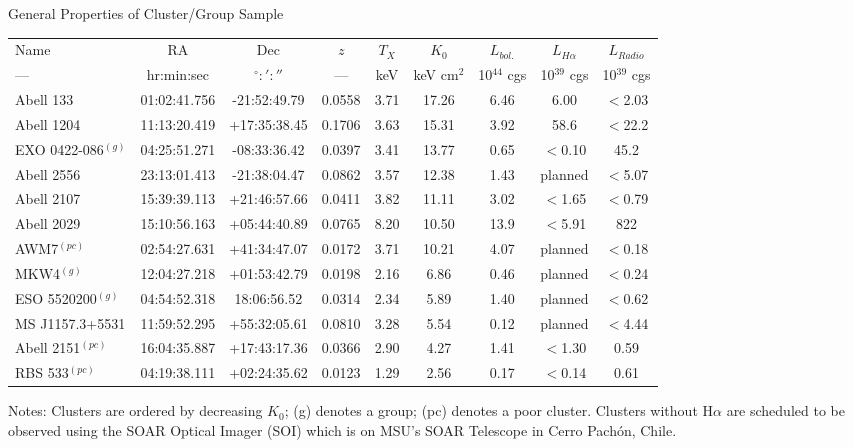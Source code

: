 \documentclass[11pt]{article}
\begin{document}
\begin{center}
General Properties of Cluster/Group Sample
\small
\begin{tabular}{lcccccccc}
\hline
Name & RA         & Dec           & $z$   & $T_X$ & $K_0$      & $L_{bol.}$    & $L_{H\alpha}$ & $L_{Radio}$\\
---  & hr:min:sec & $^\circ:':''$ & ---   & keV   & keV cm$^2$ & 10$^{44}$ cgs & 10$^{39}$ cgs & 10$^{39}$ cgs\\
\hline
\hline
Abell 133            & 01:02:41.756 & -21:52:49.79 & 0.0558 & 3.71 & 17.26 & 6.46 & 6.00    & $<$2.03\\
Abell 1204           & 11:13:20.419 & +17:35:38.45 & 0.1706 & 3.63 & 15.31 & 3.92 & 58.6    & $<$22.2\\
EXO 0422-086$^{(g)}$ & 04:25:51.271 & -08:33:36.42 & 0.0397 & 3.41 & 13.77 & 0.65 & $<$0.10 & 45.2\\
Abell 2556           & 23:13:01.413 & -21:38:04.47 & 0.0862 & 3.57 & 12.38 & 1.43 & planned & $<$5.07\\
Abell 2107           & 15:39:39.113 & +21:46:57.66 & 0.0411 & 3.82 & 11.11 & 3.02 & $<$1.65 & $<$0.79\\
Abell 2029           & 15:10:56.163 & +05:44:40.89 & 0.0765 & 8.20 & 10.50 & 13.9 & $<$5.91 & 822\\
AWM7$^{(pc)}$        & 02:54:27.631 & +41:34:47.07 & 0.0172 & 3.71 & 10.21 & 4.07 & planned & $<$0.18\\
MKW4$^{(g)}$         & 12:04:27.218 & +01:53:42.79 & 0.0198 & 2.16 & 6.86  & 0.46 & planned & $<$0.24\\
ESO 5520200$^{(g)}$  & 04:54:52.318 &  18:06:56.52 & 0.0314 & 2.34 & 5.89  & 1.40 & planned & $<$0.62\\
MS J1157.3+5531      & 11:59:52.295 & +55:32:05.61 & 0.0810 & 3.28 & 5.54  & 0.12 & planned & $<$4.44\\
Abell 2151$^{(pc)}$  & 16:04:35.887 & +17:43:17.36 & 0.0366 & 2.90 & 4.27  & 1.41 & $<$1.30 & 0.59\\
RBS 533$^{(pc)}$     & 04:19:38.111 & +02:24:35.62 & 0.0123 & 1.29 & 2.56  & 0.17 & $<$0.14 & 0.61\\
\hline
\end{tabular}
\label{tab:sample}
\end{center}
\footnotesize
Notes: Clusters are ordered by decreasing $K_0$; (g) denotes a group;
(pc) denotes a poor cluster. Clusters without H${\alpha}$ are scheduled
to be observed using the SOAR Optical Imager (SOI) which is on MSU's
SOAR Telescope in Cerro Pach\'{o}n, Chile.\\
\normalsize
\end{document}

